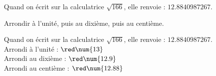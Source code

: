 \begin{exercice*}
    Quand on écrit sur la calculatrice $\sqrt{166}$, elle renvoie : $\num{12.8840987267}$.

    Arrondir à l'unité, puis au dixième, puis au centième.

\end{exercice*}
\begin{corrige}
    Quand on écrit sur la calculatrice $\sqrt{166}$, elle renvoie : $\num{12.8840987267}$.\\
        Arrondi à l'unité :   ${\red \num{13}}$\\
        Arrondi au dixième :  ${\red \num{12.9}}$\\
        Arrondi au centième : ${\red \num{12.88}}$
\end{corrige}
